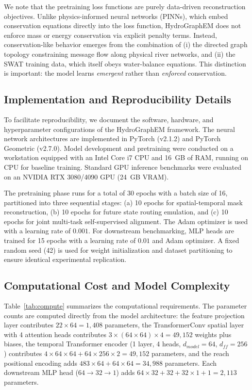 \documentclass[preprint,12pt]{elsarticle}
\begin{document}
We note that the pretraining loss functions are purely data-driven reconstruction objectives. Unlike physics-informed neural networks (PINNs), which embed conservation equations directly into the loss function, HydroGraphEM does not enforce mass or energy conservation via explicit penalty terms. Instead, conservation-like behavior emerges from the combination of (i) the directed graph topology constraining message flow along physical river networks, and (ii) the SWAT training data, which itself obeys water-balance equations. This distinction is important: the model learns \textit{emergent} rather than \textit{enforced} conservation.

\subsection{Implementation and Reproducibility Details}
To facilitate reproducibility, we document the software, hardware, and hyperparameter configurations of the HydroGraphEM framework. 
The neural network architectures are implemented in PyTorch (v2.1.2) and PyTorch Geometric (v2.7.0). Model development and pretraining were conducted on a workstation equipped with an Intel Core i7 CPU and 16~GB of RAM, running on CPU for baseline training. Standard GPU inference benchmarks were evaluated on an NVIDIA RTX 3080/4090 GPU (24~GB VRAM). 

The pretraining phase runs for a total of 30 epochs with a batch size of 16, partitioned into three sequential stages: (a) 10 epochs for spatial-temporal mask reconstruction, (b) 10 epochs for future state routing emulation, and (c) 10 epochs for joint multi-task self-supervised alignment. The Adam optimizer is used with a learning rate of $0.001$. For downstream benchmarking, MLP heads are trained for 15 epochs with a learning rate of $0.01$ and Adam optimizer. A fixed random seed (42) is used for weight initialization and dataset partitioning to ensure identical experimental replication.

\subsection{Computational Cost and Model Complexity}
Table~\ref{tab:compute} summarizes the computational requirements. The parameter counts are computed directly from the model architecture: the feature projection layer contributes $22 \times 64 = 1{,}408$ parameters, the TransformerConv spatial layer with 4 attention heads contributes $3 \times (64 \times 64) \times 4 = 49{,}152$ weights plus biases, the temporal Transformer encoder (1 layer, 4 heads, $d_{model}=64$, $d_{ff}=256$) contributes $4 \times 64 \times 64 + 64 \times 256 \times 2 = 49{,}152$ parameters, and the reach positional encoding adds $483 \times 64 + 64 \times 64 = 34{,}988$ parameters. Each downstream MLP head ($64 \rightarrow 32 \rightarrow 1$) adds $64 \times 32 + 32 + 32 \times 1 + 1 = 2{,}113$ parameters.
\end{document}
